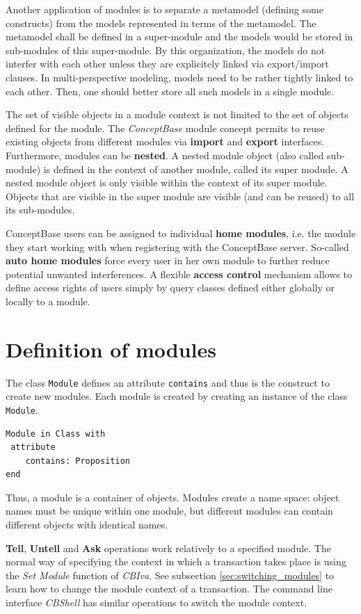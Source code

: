 Another application of modules is to separate a metamodel (defining some constructs) from
the models represented in terms of the metamodel. The metamodel shall be defined in
a super-module and the models would be stored in sub-modules of this super-module. 
By this organization, the models do not interfer with each other unless they are
explicitely linked via export/import clauses. 
In multi-perspective modeling, models need to be rather tightly linked to each other.
Then, one should better store all such models in a single module. 

The set of visible objects in a module context is not limited  to the set of objects
defined for the module.
The {\em ConceptBase} module concept permits to reuse existing objects from different modules
via {\bf import} and {\bf export} interfaces. Furthermore,  modules can be {\bf nested}.
A nested module object (also called sub-module) is defined in the
context of another module, called its super modude.
A nested module object is only visible within the context of its super module.
Objects that are visible in the super module are visible (and can be reused) to all its
sub-modules. 

ConceptBase users can be assigned to individual {\bf home modules}, i.e. the module
they start working with when registering with the ConceptBase server. So-called
{\bf auto home modules} force every user in her own module to further reduce
potential unwanted interferences. A flexible {\bf access control} mechanism
allows to define access rights of users simply by query classes defined either globally
or locally to a module. 


\section{Definition of modules}

The class {\tt Module} defines an attribute {\tt contains} and thus is the construct to
create new modules. Each module is created by creating an instance of the class {\tt Module}.

\begin{verbatim}
Module in Class with
 attribute
    contains: Proposition
end
\end{verbatim}


Thus, a module is a container of objects. Modules create a name space: object names must be unique within
one module, but different modules can contain different objects with identical names.

{\bf Tell}, {\bf Untell} and {\bf Ask} operations work relatively to a specified module.
The normal way of specifying the context in which a transaction  takes place
is using the {\em Set Module} function of {\em CBIva}. See subsection \ref{sec:switching_modules}
to learn how to change the module context of a transaction. The command line interface
{\em CBShell\/} has similar operations to switch the module context.

